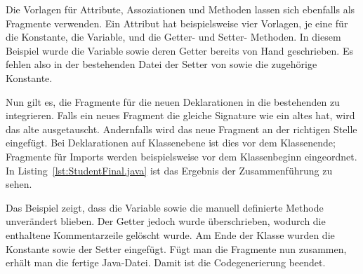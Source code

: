 Die Vorlagen für Attribute, Assoziationen und Methoden lassen sich ebenfalls als Fragmente verwenden.
Ein Attribut hat beispielsweise vier Vorlagen, je eine für die Konstante, die Variable, und die Getter- und Setter- Methoden.
In diesem Beispiel wurde die Variable  sowie deren Getter bereits von Hand geschrieben.
Es fehlen also in der bestehenden Datei der Setter von  sowie die zugehörige Konstante.

Nun gilt es, die Fragmente für die neuen Deklarationen in die bestehenden zu integrieren.
Falls ein neues Fragment die gleiche Signature wie ein altes hat, wird das alte ausgetauscht.
Andernfalls wird das neue Fragment an der richtigen Stelle eingefügt.
Bei Deklarationen auf Klassenebene ist dies vor dem Klassenende;
Fragmente für Imports werden beispielsweise vor dem Klassenbeginn eingeordnet.
In Listing~\ref{lst:StudentFinal.java} ist das Ergebnis der Zusammenführung zu sehen.


Das Beispiel zeigt, dass die Variable sowie die manuell definierte Methode unverändert blieben.
Der Getter jedoch wurde überschrieben, wodurch die enthaltene Kommentarzeile gelöscht wurde.
Am Ende der Klasse wurden die Konstante sowie der Setter eingefügt.
Fügt man die Fragmente nun zusammen, erhält man die fertige Java-Datei.
Damit ist die Codegenerierung beendet.

